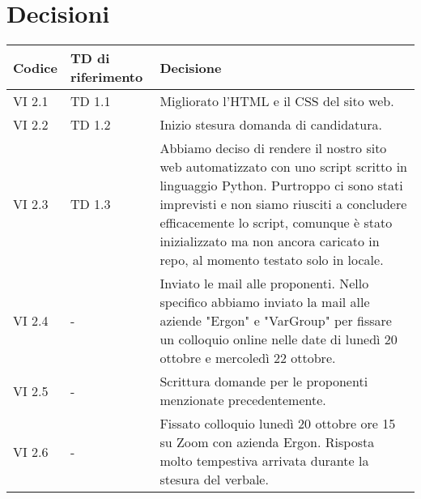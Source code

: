 \section{Decisioni}

	\begin{table}[htbp]
		\begin{tabular}{|p{}|p{}|p{}|}
			\hline
			\rowcolor[gray]{0.9}
			Codice & TD di riferimento & Decisione \\
			\hline
			VI 2.1 & TD 1.1 & Migliorato l'HTML e il CSS del sito web. \\
			\hline
			VI 2.2 & TD 1.2 & Inizio stesura domanda di candidatura. \\
			\hline
			VI 2.3 & TD 1.3 & Abbiamo deciso di rendere il nostro sito web automatizzato con uno script scritto in linguaggio Python. Purtroppo ci sono stati imprevisti e non siamo riusciti a concludere efficacemente lo script, comunque è stato inizializzato ma non ancora caricato in repo, al momento testato solo in locale. \\
			\hline
			VI 2.4 & - & Inviato le mail alle proponenti. Nello specifico abbiamo inviato la mail alle aziende "Ergon" e "VarGroup" per fissare un colloquio online nelle date di lunedì 20 ottobre e mercoledì 22 ottobre. \\
			\hline
			VI 2.5 & - & Scrittura domande per le proponenti menzionate precedentemente. \\
			\hline
			VI 2.6 & - & Fissato colloquio lunedì 20 ottobre ore 15 su Zoom con azienda Ergon. Risposta molto tempestiva arrivata durante la stesura del verbale. \\
			\hline
		\end{tabular}
	\end{table}